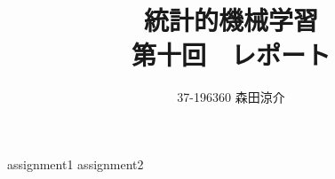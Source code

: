 \documentclass[dvipdfmx, fleqn, titlepage]{jsarticle}
\title{
	統計的機械学習 \\
	第十回　レポート
	}
\author{37-196360 \quad 森田涼介}
\begin{document}
\maketitle
{assignment1}
\clearpage
{assignment2}
\end{document}
